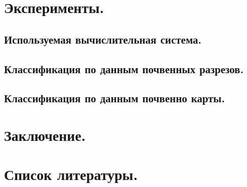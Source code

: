 \documentclass[12pt]{article}
\begin{document}
\section{Эксперименты.}


\subsection{Используемая вычислительная система.}


\subsection{Классификация по данным почвенных разрезов.}


\subsection{Классификация по данным почвенно карты.}


\section{Заключение.}


\section{Список литературы.}
\end{document}

